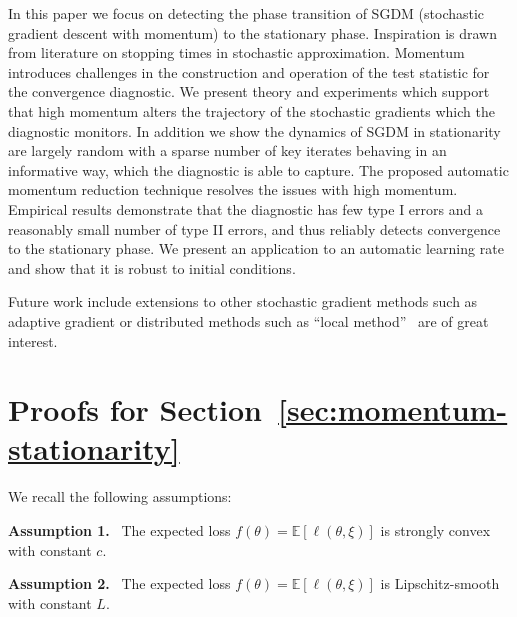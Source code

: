 \documentclass[conference]{IEEEtran}
\newcommand{\Ex}[1]{\mathbb{E}[ #1 ]}
\begin{document}
In this paper we focus on detecting the phase transition of SGDM (stochastic gradient descent with momentum) to the stationary phase.
Inspiration is drawn from literature on stopping times in stochastic approximation. 
Momentum introduces challenges in the construction and operation of the test statistic for the convergence diagnostic.
We present theory and experiments which support that high momentum alters the  trajectory of the stochastic gradients which the diagnostic monitors. In addition we show the dynamics of SGDM in stationarity are largely random with a sparse number of key iterates behaving in an informative way, which the diagnostic is able to capture.
The proposed automatic momentum reduction technique resolves the issues with high momentum. 
Empirical results demonstrate that the diagnostic has few type I errors and a reasonably small number of type II errors, and thus reliably detects convergence to the stationary phase.
We present an application to an automatic learning rate and show that it is robust to initial conditions.



Future work include extensions to other stochastic gradient methods such as adaptive gradient  or distributed methods such as ``local method''~\cite{Proc:Chen_FODS20} are  of great interest.\\






\clearpage
\onecolumn 

\appendix 


\section*{Proofs for Section~\ref{sec:momentum-stationarity}}


\noindent We recall the following assumptions:

\vspace{0.05in}

\noindent\textbf{Assumption 1.} \ The expected loss $f(\theta) = \Ex{ \ell(\theta, \xi) }$ is strongly convex with constant $c$.

\vspace{0.05in}

\noindent\textbf{Assumption 2.} \ The expected loss $f(\theta) = \Ex{ \ell(\theta, \xi) }$ is Lipschitz-smooth with constant $L$.
\end{document}
